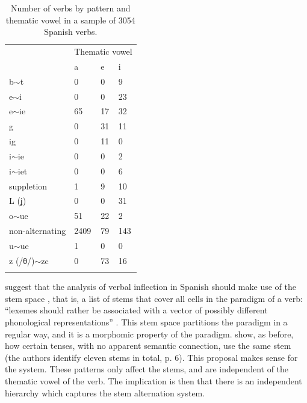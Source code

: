 \begin{table}
  \centering
  \begin{tabular}{llll}
    \lsptoprule
                    & \multicolumn{3}{c}{Thematic vowel} \\
                    & a    & e  & i                      \\
    \midrule
    b$\sim$t       & 0    & 0  & 9                      \\
    e$\sim$i        & 0    & 0  & 23                     \\
    e$\sim$ie       & 65   & 17 & 32                     \\
    g               & 0    & 31 & 11                     \\
    ig              & 0    & 11 & 0                      \\
    i$\sim$ie       & 0    & 0  & 2                      \\
    i$\sim$iet      & 0    & 0  & 6                      \\
    suppletion      & 1    & 9  & 10                     \\
    L (ʝ)           & 0    & 0  & 31                     \\
    o$\sim$ue       & 51   & 22 & 2                      \\
    non-alternating & 2409 & 79 & 143                    \\
    u$\sim$ue       & 1    & 0  & 0                      \\
    z (/θ/)$\sim$zc & 0    & 73 & 16                     \\
    \lspbottomrule
  \end{tabular}\caption{Number of verbs by pattern and thematic vowel in a sample of 3054 Spanish verbs.}\label{tab:sp-verb-minor-cross}
\end{table}

\textcite{Boye.2006} suggest that the analysis of verbal inflection in Spanish should make use of the stem space \autocite{Bonami.2003}, that is, a list of stems that cover all cells in the paradigm of a verb: ``lexemes  should  rather  be  associated  with  a  vector  of  possibly  different phonological  representations'' \autocite{Bonami.2006}. This stem space partitions the paradigm in a regular way, and it is a morphomic property of the paradigm. \textcite{Boye.2006} show, as \textcite{Maiden.2001} before, how certain tenses, with no apparent semantic connection, use the same stem (the authors identify eleven stems in total, p. 6). This proposal makes sense for the system. These patterns only affect the stems, and are independent of the thematic vowel of the verb. The implication is then that there is an independent hierarchy which captures the stem alternation system.

